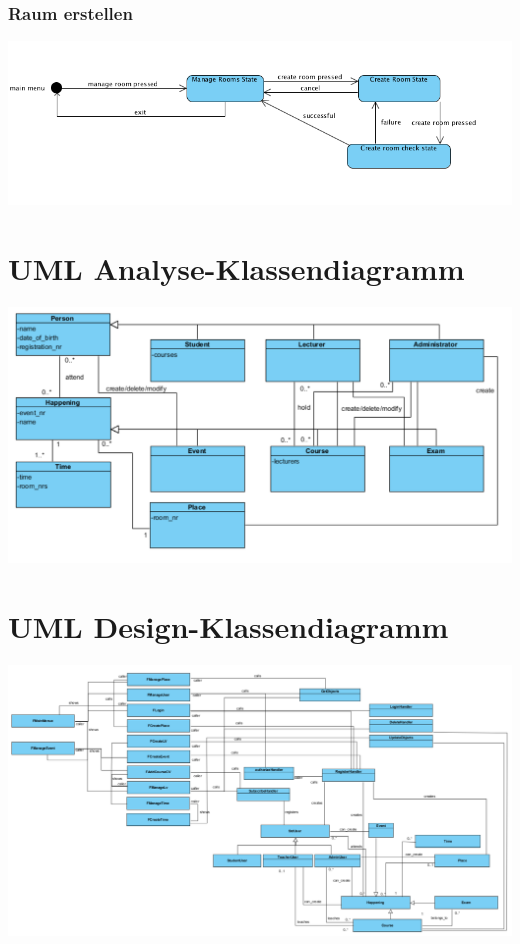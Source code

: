 \documentclass[a4paper,12pt]{article}
\begin{document}
		\subsubsection*{Raum erstellen}
			\begin{center}
				\includegraphics[scale=.5]{sc_manage_room.png}
			\end{center}
\section*{UML Analyse-Klassendiagramm}
\begin{center}
	\includegraphics[scale=.7]{AnalysisClassDiagram.png}
\end{center}
\section*{UML Design-Klassendiagramm}
\begin{center}
	\includegraphics[scale=.7,angle=90]{DesignClassDiagram.png}
\end{center}
\end{document}
